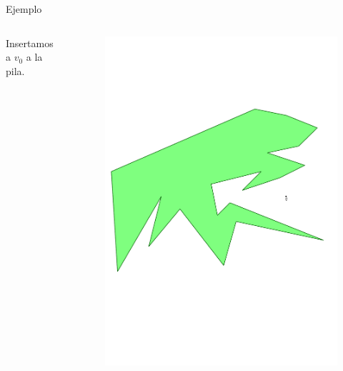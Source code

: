 \documentclass[aspectratio=169,xcolor=dvipsnames, t]{beamer}
\begin{document}
\begin{frame}{Ejemplo}
  \begin{columns}
    \begin{column}{0.3\textwidth}
      \raggedright %
      Insertamos a $v_{0}$ a la pila.
    \end{column}
    \begin{column}{0.7\textwidth}
      \vspace{-2.5cm} %
      \begin{figure}
        \centering
        \includegraphics[width=1\linewidth, height=.95\textheight, page=9, keepaspectratio]{IPE/point_visibility.pdf}
      \end{figure}
    \end{column}
  \end{columns}
\end{frame}
\end{document}

